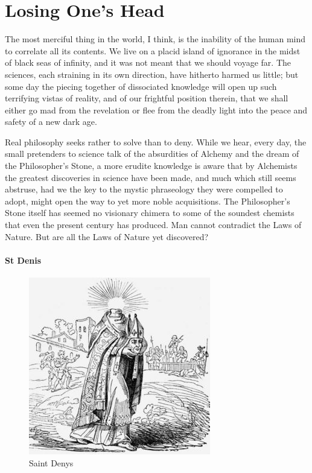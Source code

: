 \section{Losing One's Head}

\begin{quotex}
The most merciful thing in the world, I think, is the inability of the human mind to correlate all its contents. We live on a placid island of ignorance in the midst of black seas of infinity, and it was not meant that we should voyage far. The sciences, each straining in its own direction, have hitherto harmed us little; but some day the piecing together of dissociated knowledge will open up such terrifying vistas of reality, and of our frightful position therein, that we shall either go mad from the revelation or flee from the deadly light into the peace and safety of a new dark age. 

Real philosophy seeks rather to solve than to deny. While we hear, every day, the small pretenders to science talk of the absurdities of Alchemy and the dream of the Philosopher's Stone, a more erudite knowledge is aware that by Alchemists the greatest discoveries in science have been made, and much which still seems abstruse, had we the key to the mystic phraseology they were compelled to adopt, might open the way to yet more noble acquisitions. The Philosopher's Stone itself has seemed no visionary chimera to some of the soundest chemists that even the present century has produced. Man cannot contradict the Laws of Nature. But are all the Laws of Nature yet discovered? 

\end{quotex}
\paragraph{St Denis}
\begin{figure}
\includegraphics[scale=.5]{a20180830LosingOnesHead-img001.jpg} 
\caption{Saint Denys}
\end{figure}

